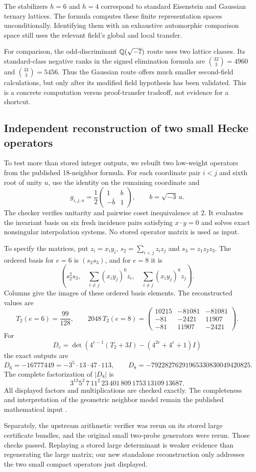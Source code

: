 The stabilizers $h=6$ and $h=4$ correspond to standard
Eisenstein and Gaussian ternary lattices. The formula computes
these finite representation spaces unconditionally. Identifying
them with an exhaustive automorphic comparison space still uses
the relevant field's global and local transfer.

For comparison, the odd-discriminant $\mathbb Q(\sqrt{-7})$ route uses
two lattice classes. Its standard-class negative ranks in the
signed elimination formula are $\binom{32}{3}=4960$ and
$\binom{33}{3}=5456$. Thus the Gaussian route offers much smaller
second-field calculations, but only after its modified field
hypothesis has been validated. This is a concrete computation
versus proof-transfer tradeoff, not evidence for a shortcut.

\subsection{Independent reconstruction of two small Hecke operators}

To test more than stored integer outputs, we rebuilt two low-weight
operators from the published 18-neighbor formula. For each coordinate
pair $i<j$ and sixth root of unity $u$, use the identity on the
remaining coordinate and
\[
 g_{i,j,u}=\frac12
 \begin{pmatrix}1&b\\-\bar b&1\end{pmatrix},
 \qquad b=\sqrt{-3}\,u.
\]
The checker verifies unitarity and pairwise coset inequivalence
at $2$. It evaluates the invariant basis on six fresh incidence
pairs satisfying $x\cdot y=0$ and solves exact nonsingular
interpolation systems. No stored operator matrix is used as input.

To specify the matrices, put $z_i=x_i y_i$,
$s_2=\sum_{i<j}z_i z_j$ and $s_3=z_1z_2z_3$.
The ordered basis for $e=6$ is $(s_2s_3)$, and for $e=8$ it is
\[
 \left(s_2^2s_3,\quad
       \sum_{i\ne j}(x_i y_j)^6z_i,\quad
       \sum_{i\ne j}(x_i y_j)^6z_j\right).
\]
Columns give the images of these ordered basis elements.
The reconstructed values are
\[
 T_2(e=6)=\frac{99}{128},\qquad
 2048\,T_2(e=8)=
 \begin{pmatrix}
 10215&-81081&-81081\\
 -81&-2421&11907\\
 -81&11907&-2421
 \end{pmatrix}.
\]
For
\[
 D_e=\det\left(4^{e-1}(T_2+3I)
                   -(4^{2e}+4^e+1)I\right)
\]
the exact outputs are
\[
 D_6=-16777449=-3^5\cdot13\cdot47\cdot113,
 \qquad
 D_8=-79228276291965330830049420825.
\]
The complete factorization of $|D_8|$ is
\[
 3^{13}5^2\,7\,11^2\,23\,401\,809\,1753\,13109\,13687.
\]
All displayed factors and multiplications are checked exactly.
The completeness and interpretation of the geometric neighbor
model remain the published mathematical input \cite{pintarcode}.

Separately, the upstream arithmetic verifier was rerun on its
stored large certificate bundles, and the original small two-probe
generators were rerun. Those checks passed. Replaying a stored
large determinant is weaker evidence than regenerating the
large matrix; our new standalone reconstruction only addresses
the two small compact operators just displayed.
